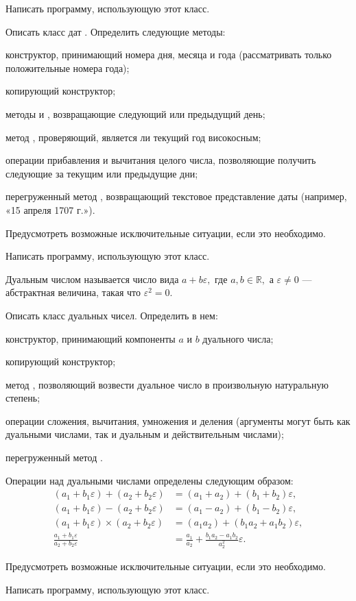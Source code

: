 Написать программу, использующую этот класс.

\task Описать класс дат . Определить следующие методы:
\begin{itemize*}
\item конструктор, принимающий номера дня, месяца и года
  (рассматривать только положительные номера года);
\item копирующий конструктор;
\item методы  и , возвращающие следующий или
  предыдущий день;
\item метод , проверяющий, является ли текущий год
  високосным;
\item операции прибавления и вычитания целого числа, позволяющие
  получить следующие за текущим или предыдущие дни;
\item перегруженный метод , возвращающий текстовое
  представление даты (например, «15 апреля 1707 г.»).
\end{itemize*}

Предусмотреть возможные исключительные ситуации, если это необходимо.

Написать программу, использующую этот класс.

\task Дуальным числом называется число вида $a+b\varepsilon,$ где $a,
b \in \mathbb{R},$ а $\varepsilon \neq 0$ — абстрактная величина,
такая что $\varepsilon^2 = 0$.

Описать класс  дуальных чисел. Определить в нем:
\begin{itemize*}
\item конструктор, принимающий компоненты $a$ и $b$ дуального числа;
\item копирующий конструктор;
\item метод , позволяющий возвести дуальное число в
  произвольную натуральную степень;
\item операции сложения, вычитания, умножения и деления (аргументы
  могут быть как дуальными числами, так и дуальным и действительным
  числами);
\item перегруженный метод .
\end{itemize*}

Операции над дуальными числами определены следующим образом:
\begin{align*}
  (a_1+b_1\varepsilon) + (a_2+b_2\varepsilon) &= (a_1+a_2) + (b_1+b_2)\varepsilon,\\
  (a_1+b_1\varepsilon) - (a_2+b_2\varepsilon) &= (a_1-a_2) + (b_1-b_2)\varepsilon,\\
  (a_1+b_1\varepsilon) \times (a_2+b_2\varepsilon) &= (a_1a_2) + (b_1a_2+a_1b_2)\varepsilon,\\
  \frac{a_1+b_1\varepsilon}{a_2+b_2\varepsilon} &=
  \frac{a_1}{a_2} + \frac{b_1a_2-a_1b_2}{a_2^2}\varepsilon.
\end{align*}

Предусмотреть возможные исключительные ситуации, если это необходимо.

Написать программу, использующую этот класс.
